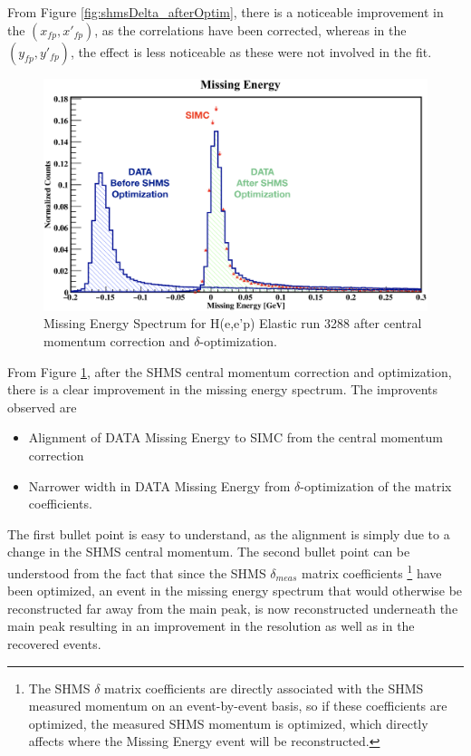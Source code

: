 \documentclass[11pt]{article}
\begin{document}
From Figure \ref{fig:shmsDelta_afterOptim}, there is a noticeable improvement in the $(x_{fp}, x'_{fp})$, as the correlations have
been corrected, whereas in the $(y_{fp}, y'_{fp})$, the effect is less noticeable as these were not involved in the fit. 
\begin{figure}[h!]
  \centering
  \includegraphics[scale=0.3]{plots/Emiss_3288_FullOptim.png}
  \caption{Missing Energy Spectrum for H(e,e'p) Elastic run 3288 after central momentum correction and $\delta$-optimization.}
  \label{fig:shmsEm_afterOptim}
\end{figure}
\newpage
\indent From Figure \ref{fig:shmsEm_afterOptim}, after the SHMS central momentum correction and optimization, there
is a clear improvement in the missing energy spectrum. The improvents observed are
\begin{itemize}
\item Alignment of DATA Missing Energy to SIMC from the central momentum correction
\item Narrower width in DATA Missing Energy from $\delta$-optimization of the matrix coefficients.
\end{itemize}
The first bullet point is easy to understand, as the alignment is simply due to a change in the SHMS central momentum.
The second bullet point can be understood from the fact that since the SHMS $\delta_{meas}$ matrix coefficients
\footnote{The SHMS $\delta$ matrix coefficients are directly associated with the SHMS measured momentum on an event-by-event
  basis, so if these coefficients are optimized, the measured SHMS momentum is optimized, which directly affects where the
  Missing Energy event will be reconstructed.}
have been optimized, an event in the missing energy spectrum that would otherwise be reconstructed far away from the
main peak, is now reconstructed underneath the main peak resulting in an improvement in the resolution as well as in
the recovered events. 
\end{document}
